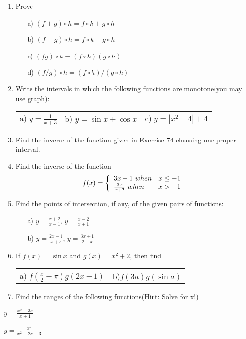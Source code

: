 \documentclass[11pt]{amsbook}
\begin{document}
\begin{enumerate}
\item Prove
\begin{enumerate}
\item[a)] $(f+g)\circ h = f\circ h + g\circ h$
\item[b)] $(f-g)\circ h = f\circ h - g\circ h$
\item[c)] $(fg)\circ h = (f\circ h)(g\circ h)$
\item[d)] $(f/g)\circ h = (f\circ h)/(g\circ h)$
\end{enumerate}
\item Write the intervals in which the following functions are monotone(you may use graph):\\
\begin{tabular}{c c c}
a) $ y = \frac{1}{x+3} $ & b) $ y = \sin x + \cos x $ &c) $ y = |x^2-4|+4$ \\ 
\end{tabular}
\item Find the inverse of the function given in Exercise 74 choosing one proper interval.
\item Find the inverse of the function
\begin{displaymath}
f(x) = \left\{
\begin{array}{lr}
3x - 1 $ $ when &  x \leq -1 \\
\frac{3x}{x+2}$ $  when  & x > -1
\end{array}
\right.
\end{displaymath}
\item Find the points of intersection, if any, of the given pairs of functions:
\begin{enumerate}
\item[a)] $y = \frac{x+2}{x-1}$, $y = \frac{x-2}{x+1}$
\item[b)] $y = \frac{2x-1}{x+3}$, $y = \frac{3x+1}{2-x}$
\end{enumerate}
\item If $f(x) = \sin x$ and $g(x) = x^2 + 2$, then find \\ 
\begin{tabular}{c c}
a) $ f(\frac{x}{2} + \pi)g(2x-1)$ & b)$f(3a)g(\sin a)$ \\ 
\end{tabular}
\item Find the ranges of the following functions(Hint: Solve for x!) 
\end{enumerate}


\begin{multicols}{2}
\begin{hItemizeBullet}
  \item $y = \frac{x^2 - 3x}{x+1}$
  \item $y = \frac{x^2}{x^2 - 2x -3}$ 
\end{hItemizeBullet}
\end{multicols}
\end{document}
